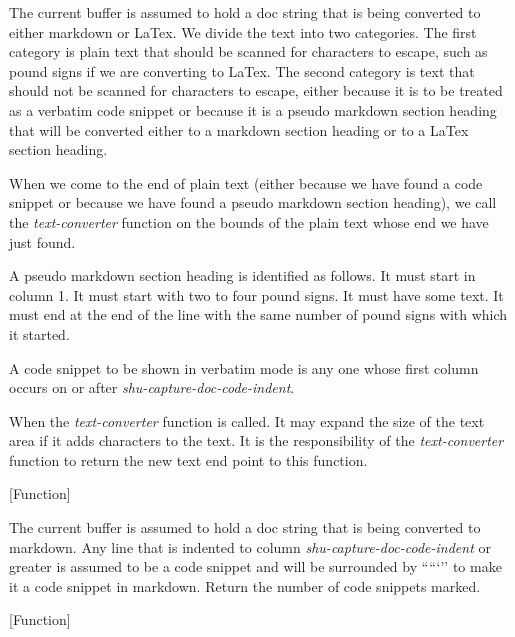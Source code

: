 \begin{doc-string}
The current buffer is assumed to hold a doc string that is being converted to
either markdown or LaTex.  We divide the text into two categories.  The first
category is plain text that should be scanned for characters to escape, such as
pound signs if we are converting to LaTex.  The second category is text that
should not be scanned for characters to escape, either because it is to be
treated as a verbatim code snippet or because it is a pseudo markdown section
heading that will be converted either to a markdown section heading or to a LaTex
section heading.

When we come to the end of plain text (either because we have found a code
snippet or because we have found a pseudo markdown section heading), we call the
\emph{text-converter} function on the bounds of the plain text whose end we have just
found.

A pseudo markdown section heading is identified as follows.  It must start in
column 1.  It must start with two to four pound signs.  It must have some text.
It must end at the end of the line with the same number of pound signs with which
it started.

A code snippet to be shown in verbatim mode is any one whose first column occurs
on or after \emph{shu-capture-doc-code-indent}.

When the \emph{text-converter} function is called.  It may expand the size of the text
area if it adds characters to the text.  It is the responsibility of the
\emph{text-converter} function to return the new text end point to this function.
\end{doc-string}

\vspace{1em}
\noindent
{}
\usebox{\funcname}
 \hfill [Function]

\begin{doc-string}
The current buffer is assumed to hold a doc string that is being converted to
markdown.  Any line that is indented to column \emph{shu-capture-doc-code-indent} or
greater is assumed to be a code snippet and will be surrounded by `````'' to make
it a code snippet in markdown.  Return the number of code snippets marked.
\end{doc-string}

\vspace{1em}
\noindent
{}
\usebox{\funcname}
 \hfill [Function]

